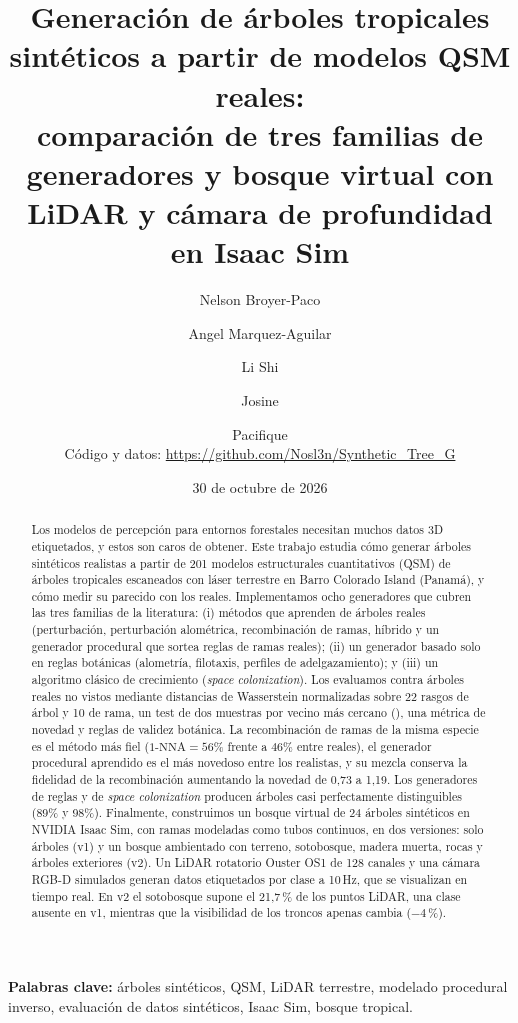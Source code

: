 \documentclass[11pt,a4paper]{article}
\title{Generación de árboles tropicales sintéticos a partir de modelos QSM reales:\\
comparación de tres familias de generadores y bosque virtual con LiDAR y cámara de profundidad en Isaac Sim}
\author{Nelson Broyer-Paco \and Angel Marquez-Aguilar \and Li Shi \and Josine \and Pacifique\\[2pt]\small Código y datos: \url{https://github.com/Nosl3n/Synthetic_Tree_G}}
\date{30 de octubre de 2026}
\newcommand{\NNA}{\text{1-NNA}}
\begin{document}
\maketitle

\begin{abstract}
Los modelos de percepción para entornos forestales necesitan muchos datos 3D etiquetados, y estos son caros de obtener. Este trabajo estudia cómo generar árboles sintéticos realistas a partir de 201 modelos estructurales cuantitativos (QSM) de árboles tropicales escaneados con láser terrestre en Barro Colorado Island (Panamá), y cómo medir su parecido con los reales. Implementamos ocho generadores que cubren las tres familias de la literatura: (i) métodos que aprenden de árboles reales (perturbación, perturbación alométrica, recombinación de ramas, híbrido y un generador procedural que sortea reglas de ramas reales); (ii) un generador basado solo en reglas botánicas (alometría, filotaxis, perfiles de adelgazamiento); y (iii) un algoritmo clásico de crecimiento (\emph{space colonization}). Los evaluamos contra árboles reales no vistos mediante distancias de Wasserstein normalizadas sobre 22 rasgos de árbol y 10 de rama, un test de dos muestras por vecino más cercano (\NNA), una métrica de novedad y reglas de validez botánica. La recombinación de ramas de la misma especie es el método más fiel ($\NNA=56\%$ frente a $46\%$ entre reales), el generador procedural aprendido es el más novedoso entre los realistas, y su mezcla conserva la fidelidad de la recombinación aumentando la novedad de 0,73 a 1,19. Los generadores de reglas y de \emph{space colonization} producen árboles casi perfectamente distinguibles (89\% y 98\%). Finalmente, construimos un bosque virtual de 24 árboles sintéticos en NVIDIA Isaac Sim, con ramas modeladas como tubos continuos, en dos versiones: solo árboles (v1) y un bosque ambientado con terreno, sotobosque, madera muerta, rocas y árboles exteriores (v2). Un LiDAR rotatorio Ouster OS1 de 128 canales y una cámara RGB-D simulados generan datos etiquetados por clase a 10\,Hz, que se visualizan en tiempo real. En v2 el sotobosque supone el 21,7\,\% de los puntos LiDAR, una clase ausente en v1, mientras que la visibilidad de los troncos apenas cambia ($-4$\,\%).
\end{abstract}

\noindent\textbf{Palabras clave:} árboles sintéticos, QSM, LiDAR terrestre, modelado procedural inverso, evaluación de datos sintéticos, Isaac Sim, bosque tropical.

\end{document}
